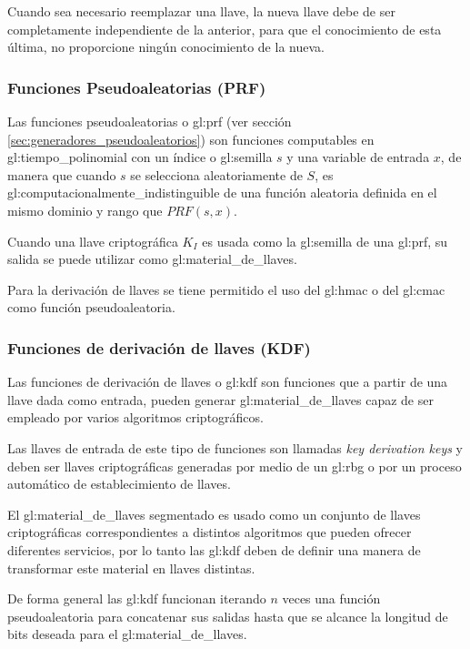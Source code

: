Cuando sea necesario reemplazar una llave, la nueva llave debe de ser
completamente independiente de la anterior, para que el conocimiento de esta
última, no proporcione ningún conocimiento de la nueva.


\subsubsection{Funciones Pseudoaleatorias (PRF)}

Las funciones pseudoaleatorias o \gls{gl:prf} (ver sección
\ref{sec:generadores_pseudoaleatorios}) son funciones computables en
\gls{gl:tiempo_polinomial} con un índice o \gls{gl:semilla} $s$ y una variable
de entrada $x$, de manera que cuando $s$ se selecciona aleatoriamente de $S$,
es \gls{gl:computacionalmente_indistinguible} de una función aleatoria
definida en el mismo dominio y rango que $PRF(s,x)$.

Cuando una llave criptográfica $K_I$ es usada como la \gls{gl:semilla} de una
\gls{gl:prf}, su salida se puede utilizar como \gls{gl:material_de_llaves}.

Para la derivación de llaves se tiene permitido el uso del \gls{gl:hmac} o
del \gls{gl:cmac} como función pseudoaleatoria.

\subsubsection{Funciones de derivación de llaves (KDF)}

Las funciones de derivación de llaves o \gls{gl:kdf} son funciones que a
partir de una llave dada como entrada, pueden generar
\gls{gl:material_de_llaves} capaz de ser empleado por varios algoritmos
criptográficos.

Las llaves de entrada de este tipo de funciones son llamadas \textit{key
derivation keys} y deben ser llaves criptográficas generadas por medio de un
\gls{gl:rbg} o por un proceso automático de establecimiento de llaves.

El \gls{gl:material_de_llaves} segmentado es usado como un conjunto de llaves
criptográficas correspondientes a distintos algoritmos que pueden ofrecer
diferentes servicios, por lo tanto las \gls{gl:kdf} deben de definir una
manera de transformar este material en llaves distintas.

De forma general las \gls{gl:kdf} funcionan iterando $n$ veces una función
pseudoaleatoria para concatenar sus salidas hasta que se alcance la longitud
de bits deseada para el \gls{gl:material_de_llaves}.


